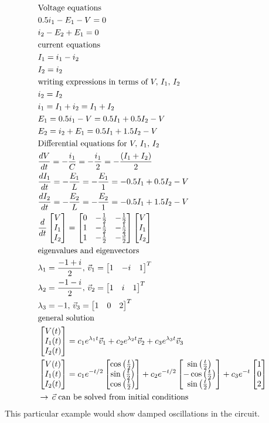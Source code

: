 \documentclass[11pt, fleqn]{article}
\begin{document}
\begin{align*}
    &\text{Voltage equations}\\
    &0.5i_1-E_1-V=0\\
    &i_2-E_2+E_1=0\\
    &\text{current equations}\\
    &I_1=i_1-i_2\\
    &I_2=i_2\\
    &\text{writing expressions in terms of }V,\,I_1,\,I_2\\
    &i_2=I_2\\
    &i_1=I_1+i_2=I_1+I_2\\
    &E_1=0.5i_1-V=0.5I_1+0.5I_2-V\\
    &E_2=i_2+E_1=0.5I_1+1.5I_2-V\\
    &\text{Differential equations for }V,\,I_1,\,I_2\\
    &\frac{dV}{dt}=-\frac{i_1}{C}=-\frac{i_1}{2}=-\frac{(I_1+I_2)}{2}\\
    &\frac{dI_1}{dt}=-\frac{E_1}{L}=-\frac{E_1}{1}=-0.5I_1+0.5I_2-V\\
    &\frac{dI_2}{dt}=-\frac{E_2}{L}=-\frac{E_2}{1}=-0.5I_1+1.5I_2-V\\
    &\frac{d}{dt}\matrixx{V\\I_1\\I_2}=\matrixx{0&-\frac{1}{2}&-\frac{1}{2}\\1&-\frac{1}{2}&-\frac{1}{2}\\1&-\frac{1}{2}&-\frac{3}{2}}\matrixx{V\\I_1\\I_2}\\
    &\text{eigenvalues and eigenvectors}\\
    &\lambda_1=\frac{-1+i}{2},\,\vec{v}_1=\matrixx{1&-i&1}^T\\
    &\lambda_2=\frac{-1-i}{2},\,\vec{v}_2=\matrixx{1&i&1}^T\\
    &\lambda_3=-1,\,\vec{v}_3=\matrixx{1&0&2}^T\\
    &\text{general solution}\\
    &\matrixx{V(t)\\I_1(t)\\I_2(t)}=c_1e^{\lambda_1t}\vec{v}_1+c_2e^{\lambda_2t}\vec{v}_2+c_3e^{\lambda_3t}\vec{v}_3\\
    &\matrixx{V(t)\\I_1(t)\\I_2(t)}=c_1e^{-t/2}\matrixx{\cos\brround{\frac{t}{2}}\\\sin\brround{\frac{t}{2}}\\\cos\brround{\frac{t}{2}}}+c_2e^{-t/2}\matrixx{\sin\brround{\frac{t}{2}}\\-\cos\brround{\frac{t}{2}}\\\sin\brround{\frac{t}{2}}}+c_3e^{-t}\matrixx{1\\0\\2}\\
    &\to\,\vec{c}\text{ can be solved from initial conditions}
\end{align*}
This particular example would show damped oscillations in the circuit.
\end{document}

